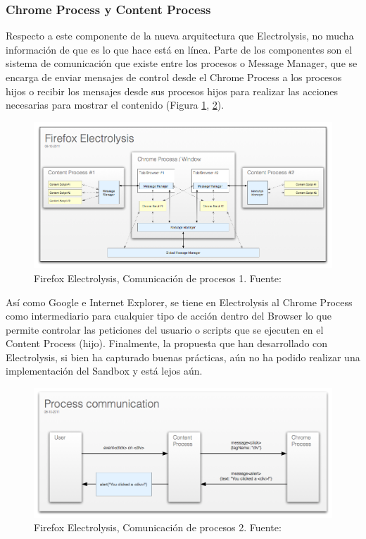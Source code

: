     \subsubsection{Chrome Process y Content Process}
    Respecto a este componente de la nueva arquitectura que Electrolysis, no mucha información de que es lo que hace está en línea. Parte de los componentes son el sistema de comunicación que existe entre los procesos o Message Manager, que se encarga de enviar mensajes de control desde el Chrome Process a los procesos hijos o recibir los mensajes desde sus procesos hijos para realizar las acciones necesarias para mostrar el contenido (Figura \ref{fig:ChromePComm1}, \ref{fig:ChromePComm2}).
        \begin{figure}[h!t]
            \centering
            \includegraphics[width=1\textwidth]{figures/electrolysis.png}
            \caption{Firefox Electrolysis, Comunicación de procesos 1. Fuente: \cite{Firefox101}}
            \label{fig:ChromePComm1}
        \end{figure}

    Así como Google e Internet Explorer, se tiene en Electrolysis al Chrome Process como intermediario para cualquier tipo de acción dentro del Browser lo que permite controlar las peticiones del usuario o scripts que se ejecuten en el Content Process (hijo). Finalmente, la propuesta que han desarrollado con Electrolysis, si bien ha capturado buenas prácticas, aún no ha podido realizar una implementación del Sandbox y está lejos aún.

        \begin{figure}[h!t]
            \centering
            \includegraphics[width=1\textwidth]{figures/e10s-processes.png}
            \caption{Firefox Electrolysis, Comunicación de procesos 2. Fuente: \cite{Firefox101}}
            \label{fig:ChromePComm2}
        \end{figure}

